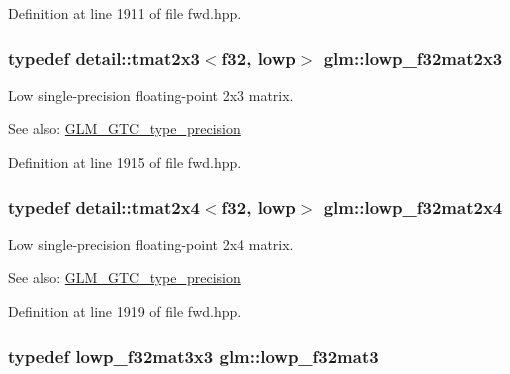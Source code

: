 Definition at line 1911 of file fwd.hpp.\hypertarget{group__gtc__type__precision_g7e45acb54ae2e4f5113a05b08eea5812}{
\subsubsection[lowp\_\-f32mat2x3]{\setlength{\rightskip}{0pt plus 5cm}typedef detail::tmat2x3$<$f32, lowp$>$ {\bf glm::lowp\_\-f32mat2x3}}}
\label{group__gtc__type__precision_g7e45acb54ae2e4f5113a05b08eea5812}


Low single-precision floating-point 2x3 matrix. \begin{Desc}
\item[See also:]\hyperlink{group__gtc__type__precision}{GLM\_\-GTC\_\-type\_\-precision} \end{Desc}


Definition at line 1915 of file fwd.hpp.\hypertarget{group__gtc__type__precision_ge0da8e4239df703d44875b49a900c893}{
\subsubsection[lowp\_\-f32mat2x4]{\setlength{\rightskip}{0pt plus 5cm}typedef detail::tmat2x4$<$f32, lowp$>$ {\bf glm::lowp\_\-f32mat2x4}}}
\label{group__gtc__type__precision_ge0da8e4239df703d44875b49a900c893}


Low single-precision floating-point 2x4 matrix. \begin{Desc}
\item[See also:]\hyperlink{group__gtc__type__precision}{GLM\_\-GTC\_\-type\_\-precision} \end{Desc}


Definition at line 1919 of file fwd.hpp.\hypertarget{group__gtc__type__precision_g84500ab23c0f0f3c585f8ad02f33b88c}{
\subsubsection[lowp\_\-f32mat3]{\setlength{\rightskip}{0pt plus 5cm}typedef lowp\_\-f32mat3x3 {\bf glm::lowp\_\-f32mat3}}}
\label{group__gtc__type__precision_g84500ab23c0f0f3c585f8ad02f33b88c}


